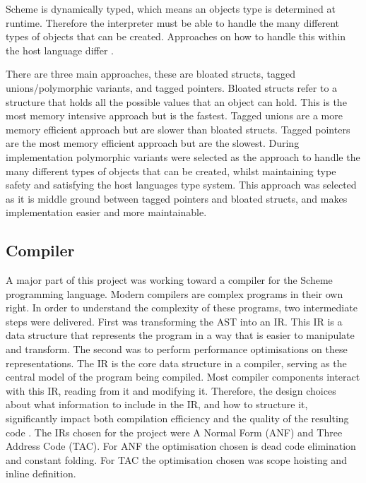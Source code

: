 \documentclass[final]{cmpreport_02}
\begin{document}
Scheme is dynamically typed, which means an objects type is determined at runtime. Therefore the interpreter must be able to handle the many different types of objects that can be created. 
Approaches on how to handle this within the host language differ \cite{SchemeImplementations}. \newline

There are three main approaches, these are bloated structs, tagged unions/polymorphic variants, and tagged pointers. 
Bloated structs refer to a structure that holds all the possible values that an object can hold. This is the most memory intensive approach but is the fastest. Tagged unions are a more memory efficient approach but are slower than bloated structs. Tagged pointers are the most memory efficient approach but are the slowest.
During implementation polymorphic variants were selected as the approach to handle the many different types of objects that can be created, whilst maintaining type safety and satisfying the host languages type system. 
This approach was selected as it is middle ground between tagged pointers and bloated structs, and makes implementation easier and more maintainable.

\subsection{Compiler}
A major part of this project was working toward a compiler for the Scheme programming language. Modern compilers are complex programs in their own right. In order to understand the complexity of these programs, two intermediate steps were delivered.
First was transforming the AST into an IR. This IR is a data structure that represents the program in a way that is easier to manipulate and transform. The second was to perform performance optimisations on these representations.
The IR is the core data structure in a compiler, serving as the central model of the program being compiled. Most compiler components interact with this IR, reading from it and modifying it. Therefore, the design choices about what information to include in the IR, and how to structure it, significantly impact both compilation efficiency and the quality of the resulting code \cite{cooper2011engineering}. 
The IRs chosen for the project were A Normal Form (ANF) and Three Address Code (TAC). For ANF the optimisation chosen is dead code elimination and constant folding. For TAC the optimisation chosen was scope hoisting and inline definition.
\end{document}
